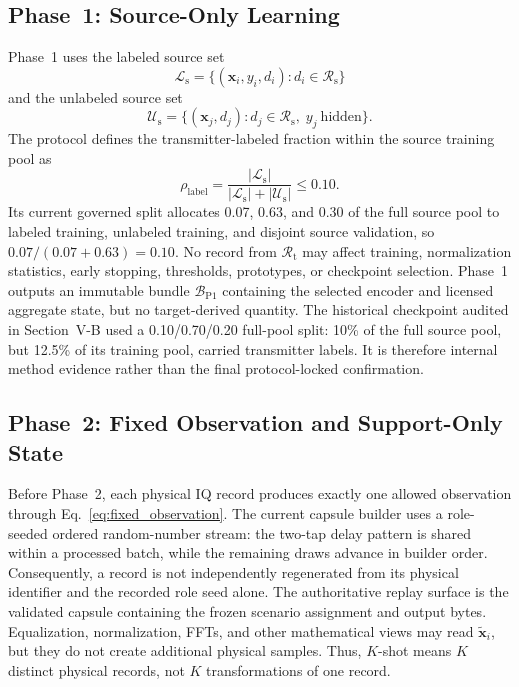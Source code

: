 \documentclass[journal]{IEEEtran}
\newcommand{\Rsource}{\mathcal{R}_{\mathrm{s}}}
\newcommand{\Rtarget}{\mathcal{R}_{\mathrm{t}}}
\begin{document}
\subsection{Phase~1: Source-Only Learning}

Phase~1 uses the labeled source set
\begin{equation}
\mathcal{L}_{\mathrm{s}} =
\{(\mathbf{x}_i,y_i,d_i):d_i\in\Rsource\}
\end{equation}
and the unlabeled source set
\begin{equation}
\mathcal{U}_{\mathrm{s}} =
\{(\mathbf{x}_j,d_j):d_j\in\Rsource,\;y_j\ \text{hidden}\}.
\end{equation}
The protocol defines the transmitter-labeled fraction within the source training pool as
\begin{equation}
\rho_{\mathrm{label}}=
\frac{|\mathcal{L}_{\mathrm{s}}|}
{|\mathcal{L}_{\mathrm{s}}|+|\mathcal{U}_{\mathrm{s}}|}
\leq 0.10.
\label{eq:label_fraction}
\end{equation}
Its current governed split allocates 0.07, 0.63, and 0.30 of the full source pool to labeled training, unlabeled training, and disjoint source validation, so \(0.07/(0.07+0.63)=0.10\). No record from \(\Rtarget\) may affect training, normalization statistics, early stopping, thresholds, prototypes, or checkpoint selection. Phase~1 outputs an immutable bundle \(\mathcal{B}_{\mathrm{P1}}\) containing the selected encoder and licensed aggregate state, but no target-derived quantity. The historical checkpoint audited in Section~V-B used a 0.10/0.70/0.20 full-pool split: 10\% of the full source pool, but 12.5\% of its training pool, carried transmitter labels. It is therefore internal method evidence rather than the final protocol-locked confirmation.

\subsection{Phase~2: Fixed Observation and Support-Only State}

Before Phase~2, each physical IQ record produces exactly one allowed observation through Eq.~\eqref{eq:fixed_observation}. The current capsule builder uses a role-seeded ordered random-number stream: the two-tap delay pattern is shared within a processed batch, while the remaining draws advance in builder order. Consequently, a record is not independently regenerated from its physical identifier and the recorded role seed alone. The authoritative replay surface is the validated capsule containing the frozen scenario assignment and output bytes. Equalization, normalization, FFTs, and other mathematical views may read \(\widetilde{\mathbf{x}}_i\), but they do not create additional physical samples. Thus, \(K\)-shot means \(K\) distinct physical records, not \(K\) transformations of one record.
\end{document}
